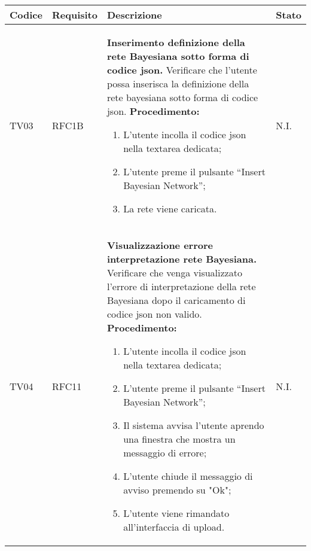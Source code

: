 \begin{table}[!htpb]
	\centering
	\renewcommand{\arraystretch}{2} 
	\begin{tabular}{|l|l|p{10cm}|l|}
		\rowcolor{orange!50}
		\hline
		\textbf{Codice} & \textbf{Requisito}& \textbf{Descrizione} & \textbf{Stato}\\ 
		\hline
		TV03 & RFC1B 	& 
			\textbf{Inserimento definizione della rete Bayesiana sotto forma di codice json.} 
			\newline
			Verificare che l'utente possa inserisca la definizione della rete bayesiana sotto forma di codice json. 
			\newline 
			\textbf{Procedimento:} 
			\begin{enumerate} 
				\item L’utente incolla il codice json nella textarea dedicata; 
				\item L’utente preme il pulsante “Insert Bayesian Network”; 
				\item La rete viene caricata. 
			\end{enumerate} 
			& N.I.\\
		\hline
		TV04 & RFC11 	& 
			\textbf{Visualizzazione errore interpretazione rete Bayesiana.} 
			\newline
			Verificare che venga visualizzato l'errore di interpretazione della rete Bayesiana dopo il caricamento di codice json non valido. 
			\newline 
			\textbf{Procedimento:} 
			\begin{enumerate} 
				\item L’utente incolla il codice json nella textarea dedicata; 
				\item L’utente preme il pulsante “Insert Bayesian Network”; 
				\item Il sistema avvisa l'utente aprendo una finestra che mostra un messaggio di errore; 
				\item L'utente chiude il messaggio di avviso premendo su "Ok"; 
				\item L'utente viene rimandato all'interfaccia di upload. 
			\end{enumerate} 
			& N.I.\\
		\hline
	\end{tabular}
\end{table}
